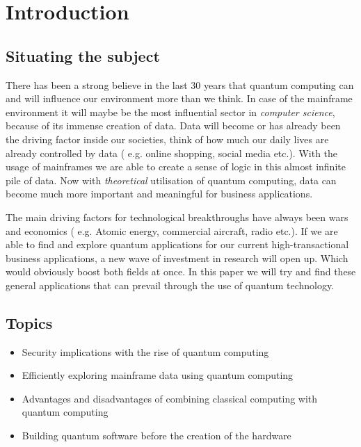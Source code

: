 
\section{Introduction} %
\label{sec:introductie}
\subsection{Situating the subject}
 There has been a strong believe in the last 30 years that quantum computing can and will influence our environment more than we think. In case of the mainframe environment it will maybe be the most influential sector in \emph{computer science}, because of its immense creation of data. Data will become or has already been the driving factor inside our societies, think of how much our daily lives are already controlled by data ( e.g. online shopping, social media etc.). With the usage of mainframes we are able to create a sense of logic in this almost infinite pile of data. Now with \emph{ theoretical} utilisation of quantum computing, data can become much more important and meaningful for business applications. 
 
 The main driving factors for technological breakthroughs have always been wars and economics ( e.g. Atomic energy, commercial aircraft, radio etc.). If we are able to find and explore quantum applications for our current high-transactional business applications, a new wave of investment in research will open up. Which would obviously boost both fields at once. In this paper we will try and find these general applications that can prevail through the use of quantum technology.

\subsection{Topics}
\begin{itemize}
  \item Security implications with the rise of quantum computing
  \item Efficiently exploring mainframe data using quantum computing
  \item Advantages and disadvantages of combining classical computing with quantum computing
  \item Building quantum software before the creation of the hardware
\end{itemize}

